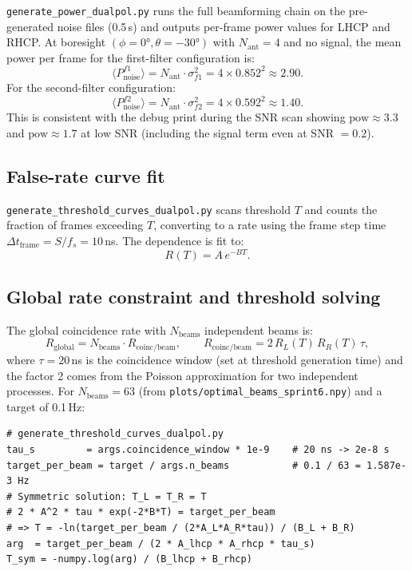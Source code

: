 \documentclass[11pt,letterpaper]{article}
\newenvironment{codebox}{%
  \begin{mdframed}[backgroundcolor=codebg,linewidth=0.5pt,innerleftmargin=6pt,innerrightmargin=6pt,innertopmargin=4pt,innerbottommargin=4pt]%
  \small}{\end{mdframed}}
\begin{document}
\texttt{generate\_power\_dualpol.py} runs the full beamforming chain on the
pre-generated noise files (0.5\,s) and outputs per-frame power values for
LHCP and RHCP.  At boresight $(\phi=0°, \theta=-30°)$ with $N_\mathrm{ant}=4$
and no signal, the mean power per frame for the first-filter configuration is:
\[
  \langle P_\mathrm{noise}^{f1} \rangle
    = N_\mathrm{ant} \cdot \sigma_{f1}^2
    = 4 \times 0.852^2
    \approx 2.90.
\]
For the second-filter configuration:
\[
  \langle P_\mathrm{noise}^{f2} \rangle
    = N_\mathrm{ant} \cdot \sigma_{f2}^2
    = 4 \times 0.592^2
    \approx 1.40.
\]
This is consistent with the debug print during the SNR scan showing
$\mathrm{pow} \approx 3.3$ and $\mathrm{pow} \approx 1.7$ at low SNR
(including the signal term even at SNR $= 0.2$).

\subsection{False-rate curve fit}

\texttt{generate\_threshold\_curves\_dualpol.py} scans threshold $T$ and
counts the fraction of frames exceeding $T$, converting to a rate using the
frame step time $\Delta t_\mathrm{frame} = S / f_s = 10$\,ns.  The dependence
is fit to:
\[
  R(T) = A\,e^{-BT}.
\]

\subsection{Global rate constraint and threshold solving}

The global coincidence rate with $N_\mathrm{beams}$ independent beams is:
\[
  R_\mathrm{global} = N_\mathrm{beams} \cdot R_\mathrm{coinc/beam},
  \qquad
  R_\mathrm{coinc/beam} = 2\,R_L(T)\,R_R(T)\,\tau,
\]
where $\tau = 20$\,ns is the coincidence window (set at threshold generation
time) and the factor 2 comes from the Poisson approximation for two
independent processes.  For $N_\mathrm{beams} = 63$ (from
\texttt{plots/optimal\_beams\_sprint6.npy}) and a target of 0.1\,Hz:

\begin{codebox}
\begin{Verbatim}
# generate_threshold_curves_dualpol.py
tau_s         = args.coincidence_window * 1e-9    # 20 ns -> 2e-8 s
target_per_beam = target / args.n_beams           # 0.1 / 63 = 1.587e-3 Hz
# Symmetric solution: T_L = T_R = T
# 2 * A^2 * tau * exp(-2*B*T) = target_per_beam
# => T = -ln(target_per_beam / (2*A_L*A_R*tau)) / (B_L + B_R)
arg  = target_per_beam / (2 * A_lhcp * A_rhcp * tau_s)
T_sym = -numpy.log(arg) / (B_lhcp + B_rhcp)
\end{Verbatim}
\end{codebox}
\end{document}
